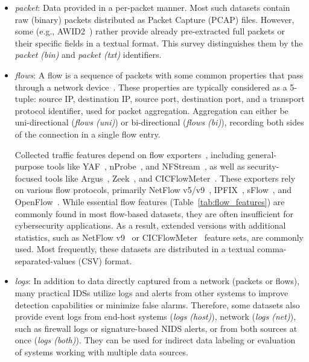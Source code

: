 \begin{itemize}
    \item \emph{packet}: Data provided in a per-packet manner. Most such datasets contain raw (binary) packets distributed as Packet Capture (PCAP) files. However, some (e.g., AWID2~\cite{kolias2015_awid2_dataset}) rather provide already pre-extracted full packets or their specific fields in a textual format. This survey distinguishes them by the \emph{packet (bin)} and \emph{packet (txt)} identifiers.

    \item \emph{flows}: A flow is a sequence of packets with some common properties that pass through a network device~\cite{claise2004_rfc3954_netflow}. These properties are typically considered as a 5-tuple: source IP, destination IP, source port, destination port, and a transport protocol identifier, used for packet aggregation. Aggregation can either be uni-directional (\emph{flows (uni)}) or bi-directional (\emph{flows (bi)}), recording both sides of the connection in a single flow entry.
    
    Collected traffic features depend on flow exporters~\cite{vormayr2020_why_are_my_flows_different}, including general-purpose tools like YAF~\cite{inacio2010_yaf}, nProbe~\cite{ntop_nprobe}, and NFStream~\cite{aouini2022_nfstream}, as well as security-focused tools like Argus~\cite{qosient_argus}, Zeek~\cite{paxson1999_bro}, and CICFlowMeter~\cite{lashkari2016_cicflowmeter}. These exporters rely on various flow protocols, primarily NetFlow v5/v9~\cite{claise2004_rfc3954_netflow}, IPFIX~\cite{aitken2013_rfc7011}, sFlow~\cite{phaal2004_sflow5}, and OpenFlow~\cite{openflow_switch_specs151}. While essential flow features (Table~\ref{tab:flow_features}) are commonly found in most flow-based datasets, they are often insufficient for cybersecurity applications. As a result, extended versions with additional statistics, such as NetFlow v9~\cite{cisco_netflow_v9_format} or CICFlowMeter~\cite{lashkari2021_cicflowmeter_features} feature sets, are commonly used. Most frequently, these datasets are distributed in a textual comma-separated-values (CSV) format.

    \item \emph{logs}: In addition to data directly captured from a network (packets or flows), many practical IDSs utilize logs and alerts from other systems to improve detection capabilities or minimize false alarms. Therefore, some datasets also provide event logs from end-host systems (\emph{logs (host)}), network (\emph{logs (net)}), such as firewall logs or signature-based NIDS alerts, or from both sources at once (\emph{logs (both)}). They can be used for indirect data labeling or evaluation of systems working with multiple data sources.


\end{itemize}
